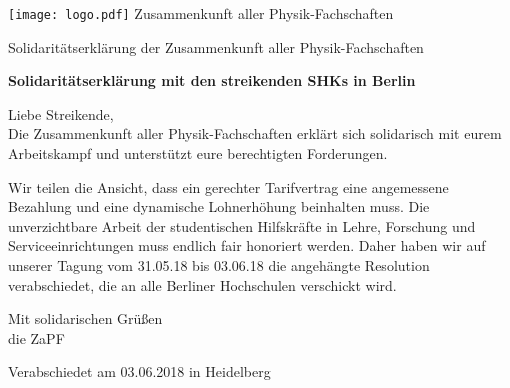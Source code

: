 \documentclass[DIV=calc]{scrartcl}
\begin{document}
    \hspace{0.87\textwidth}
    \begin{minipage}{120pt}
        \vspace{-1.8cm}
        \texttt{[image: logo.pdf]}
        \centering
        \small Zusammenkunft aller Physik-Fachschaften
    \end{minipage}
    \begin{center}
        \huge{Solidaritätserklärung der Zusammenkunft aller Physik-Fachschaften}\vspace{.25\baselineskip}\\
        \normalsize
    \end{center}
    \vspace{1cm} 
 
\textbf{\large{Solidaritätserklärung	mit	den	streikenden	SHKs	in	Berlin}}



Liebe	Streikende,\\
Die Zusammenkunft aller Physik-Fachschaften erklärt sich solidarisch mit eurem Arbeitskampf und unterstützt eure berechtigten Forderungen.

Wir	teilen	die	Ansicht,	dass	ein	gerechter	Tarifvertrag	eine	angemessene	Bezahlung	und	eine
dynamische	Lohnerhöhung	beinhalten	muss.	Die	unverzichtbare	Arbeit	der	studentischen
Hilfskräfte	in	Lehre,	Forschung	und	Serviceeinrichtungen	muss	endlich	fair honoriert	werden.
Daher	haben	wir	auf	unserer	Tagung	vom	31.05.18	bis	03.06.18	die	angehängte	Resolution
verabschiedet,	die	an	alle	Berliner	Hochschulen	verschickt	wird.

Mit	solidarischen Grüßen\\
die	ZaPF

    \begin{flushright}
        Verabschiedet am 03.06.2018 in Heidelberg
    \end{flushright}
\end{document}
